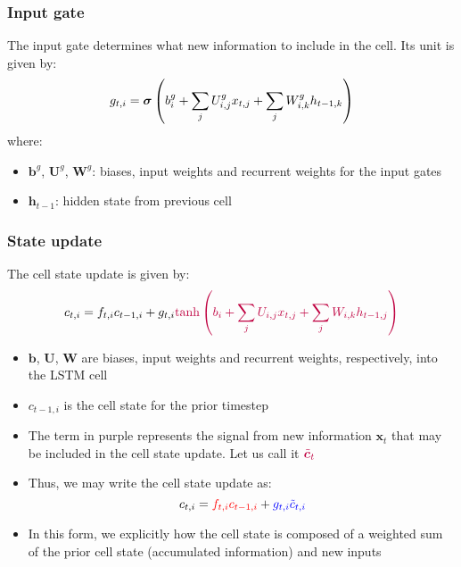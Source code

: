 \documentclass[smaller]{beamer}
\begin{document}
\begin{frame}
  \frametitle{Input gate}
  \pause

  The input gate determines what new information to include in the cell. \pe Its unit is given by:
    \pause
    \begin{equation}
      g_{t,i} = \bm\sigma\left(b_{i}^{g} + \sum_{j}U_{i,j}^{g}x_{t,j} + \sum_{j}W_{i,k}^{g}h_{t-1,k}\right)
    \end{equation} \pause
    where:
    \begin{itemize}
    \item $\bm b^{g}$, $\bm U^{g}$, $\bm W^{g}$: biases, input weights and recurrent weights for the input gates
    \item $\bm h_{t-1}$: hidden state from previous cell \pause
    \end{itemize}
   
\end{frame}


\begin{frame}
  \frametitle{State update}
  \pause

 
  The cell state update is given by:
     \begin{equation}
      c_{t,i} = f_{t,i}c_{t-1,i} + g_{t,i}{\color{purple} \tanh\left(b_{i} + \sum_{j}U_{i,j}x_{t,j} + \sum_{j}W_{i,k}h_{t-1,j}\right)}
    \end{equation}\pause
   
    \begin{itemize}
    \item $\bm b$, $\bm U$, $\bm W$ are biases, input weights and recurrent weights, respectively, into the LSTM cell
    \item $c_{t-1,i}$ is the cell state for the prior timestep
    \item The term in {\pl purple} represents the signal from new information $\bm x_{t}$ that may be included in the cell
      state update. Let us call it $\color{purple} \tilde{\bm c}_{t}$
 
    \item     Thus, we may write the cell state update as: \pause
    \begin{equation}
      c_{t,i} = {\color{red} f_{t,i}c_{t-1,i}} +{\color{blue} g_{t,i}\tilde{c}_{t,i}}
    \end{equation}
  \item In this form, we explicitly how the cell state is composed of a weighted sum of the {\rd prior cell state (accumulated information)} and {\bl new inputs}

    
    \end{itemize}
 \end{frame}
\end{document}
